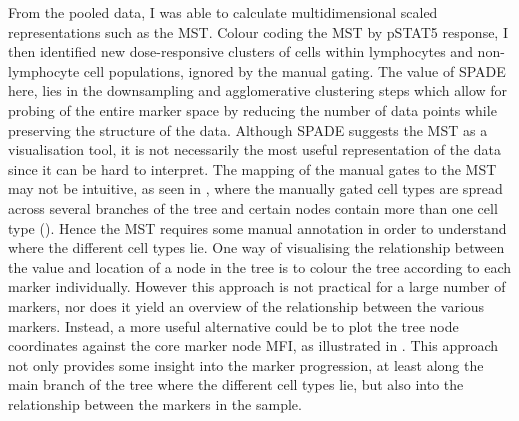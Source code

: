 From the pooled data, I was able to calculate multidimensional scaled representations such as the \gls{MST}.  
Colour coding the \gls{MST} by pSTAT5 response, I then identified new dose-responsive clusters of cells within lymphocytes and non-lymphocyte cell populations, ignored by the manual gating.
The value of \gls{SPADE} here, lies in the downsampling and agglomerative clustering steps which allow for probing of the entire marker space by reducing the number of data points while preserving the structure of the data.
Although \gls{SPADE} suggests the \gls{MST} as a visualisation tool, it is not necessarily the most useful representation of the data since it can be hard to interpret.
The mapping of the manual gates to the MST may not be intuitive, as seen in ,
where the manually gated cell types are spread across several branches of the tree and certain nodes contain more than one cell type ().
Hence the \gls{MST} requires some manual annotation in order to understand where the different cell types lie.
One way of visualising the relationship between the value and location of a node in the tree is to colour the tree according to each marker individually.
However this approach is not practical for a large number of markers, nor does it yield an overview of the relationship between the various markers.
Instead, a more useful alternative could be to plot the tree node coordinates against the core marker node MFI, as illustrated in .
This approach not only provides some insight into the marker progression, at least along the main branch of the tree where the different cell types lie, but also into the relationship between the markers in the sample.
